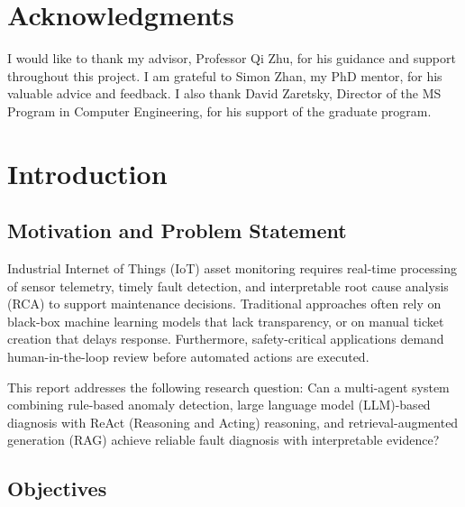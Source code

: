 \documentclass[12pt,letterpaper]{report}
\begin{document}
\newpage

\tableofcontents
\newpage

\listoffigures
{}
\newpage

\listoftables
{}
\newpage

\chapter*{Acknowledgments}

I would like to thank my advisor, Professor Qi Zhu, for his guidance and support throughout this project. I am grateful to Simon Zhan, my PhD mentor, for his valuable advice and feedback. I also thank David Zaretsky, Director of the MS Program in Computer Engineering, for his support of the graduate program.

\newpage

\chapter{Introduction}
\label{ch:intro}

\section{Motivation and Problem Statement}

Industrial Internet of Things (IoT) asset monitoring requires real-time processing of sensor telemetry, timely fault detection, and interpretable root cause analysis (RCA) to support maintenance decisions. Traditional approaches often rely on black-box machine learning models that lack transparency, or on manual ticket creation that delays response. Furthermore, safety-critical applications demand human-in-the-loop review before automated actions are executed.

This report addresses the following research question: Can a multi-agent system combining rule-based anomaly detection, large language model (LLM)-based diagnosis with ReAct (Reasoning and Acting) reasoning, and retrieval-augmented generation (RAG) achieve reliable fault diagnosis with interpretable evidence?

\section{Objectives}
\end{document}
